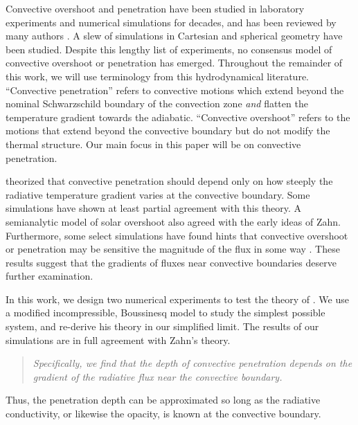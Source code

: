\documentclass{aastex631}
\begin{document}
Convective overshoot and penetration have been studied in laboratory experiments and numerical simulations for decades, and has been reviewed by many authors \citep{marcus_etal_1983, zahn1991, browning_etal_2004, rogers_etal_2006, viallet_etal_2015, korre_etal_2019}.
A slew of simulations in Cartesian \citep{musman1968, moore_weiss_1973, hurlburt_etal_1986, hurlburt_etal_1994, singh_etal_1995, saikia_etal_2000, brummell_etal_2002, rogers_glatzmaier_2005, kapyla_etal_2007, tian_etal_2009, andrassy_spruit_2015, kitiashvili_etal_2016, lecoanet_etal_2016, kapyla_etal_2017, couston_etal_2017, toppaladoddi_wettlaufer_2018, kapyla2019, cai2020} and spherical \citep{browning_etal_2004, rogers_etal_2006, brun_etal_2017, pratt_etal_2017, dietrich_wicht_2018, higl_etal_2021} geometry have been studied.
Despite this lengthy list of experiments, no consensus model of convective overshoot or penetration has emerged.
Throughout the remainder of this work, we will use terminology from this hydrodynamical literature.
``Convective penetration'' refers to convective motions which extend beyond the nominal Schwarzschild boundary of the convection zone \emph{and} flatten the temperature gradient towards the adiabatic.
``Convective overshoot'' refers to the motions that extend beyond the convective boundary but do not modify the thermal structure.
Our main focus in this paper will be on convective penetration.

\citet{zahn1991} theorized that convective penetration should depend only on how steeply the radiative temperature gradient varies at the convective boundary.
Some simulations \citep{hurlburt_etal_1994, rogers_etal_2006} have shown at least partial agreement with this theory.
A semianalytic model of solar overshoot \citep{rempel2004} also agreed with the early ideas of Zahn. 
Furthermore, some select simulations have found hints that convective overshoot or penetration may be sensitive the magnitude of the flux in some way \citep{singh_etal_1998, hotta2017, kapyla2019}.
These results suggest that the gradients of fluxes near convective boundaries deserve further examination.

In this work, we design two numerical experiments to test the theory of \citet{zahn1991}.
We use a modified incompressible, Boussinesq model to study the simplest possible system, and re-derive his theory in our simplified limit.
The results of our simulations are in full agreement with Zahn's theory.
\begin{quote}
\emph{
Specifically, we find that the depth of convective penetration depends on the gradient of the radiative flux near the convective boundary.
}
\end{quote}
Thus, the penetration depth can be approximated so long as the radiative conductivity, or likewise the opacity, is known at the convective boundary.
\end{document}
